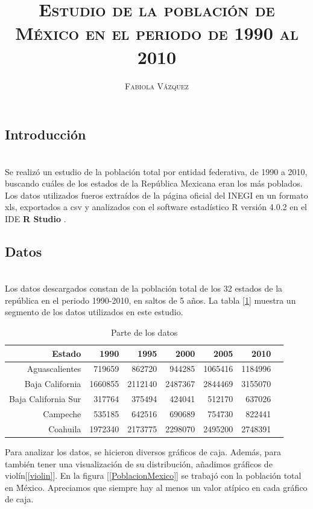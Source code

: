 \documentclass[12pt,letterpaper]{article}
\title{\textsc{Estudio de la población de México en el periodo de 1990 al 2010}}
\author{\textsc{Fabiola Vázquez}}
\begin{document}
\maketitle

\subsection*{Introducción}~\\
Se realizó un estudio de la población total por entidad federativa, de 1990 a 2010, buscando cuáles de los estados de la República Mexicana eran los más poblados. Los datos utilizados fueros extraídos de la página oficial del INEGI \cite{inegi} en un formato \textrm{xls}, exportados a \textrm{csv} y analizados con el software estadístico R versión 4.0.2 \cite{R} en el IDE \textbf{R Studio} \cite{rstudio}. 

\subsection*{Datos}~\\
Los datos descargados constan de la población total de los 32 estados de la república en el periodo 1990-2010, en saltos de 5 años. La tabla [\ref{tab:Datos}] muestra un segmento de los datos utilizados en este estudio.
\begin{table}[ht]
\centering
\begin{tabular}{rrrrrrr}
  \hline
 Estado & 1990 & 1995 & 2000 & 2005 & 2010 \\ 
  \hline
Aguascalientes & 719659 & 862720 & 944285 & 1065416 & 1184996 \\ 
 Baja California & 1660855 & 2112140 & 2487367 & 2844469 & 3155070 \\ 
 Baja California Sur & 317764 & 375494 & 424041 & 512170 & 637026 \\ 
 Campeche & 535185 & 642516 & 690689 & 754730 & 822441 \\ 
 Coahuila & 1972340 & 2173775 & 2298070 & 2495200 & 2748391 \\ 
   \hline
\end{tabular}
\caption{Parte de los datos}
\label{tab:Datos}
\end{table}

\newpage

Para analizar los datos, se hicieron diversos gráficos de caja. Además, para también tener una visualización de su distribución, añadimos gráficos de violín[\ref{violin}]. En la figura [\ref{PoblacionMexico}] se trabajó con la población total en México. Apreciamos que siempre hay al menos un valor atípico en cada gráfico de caja.
\end{document}
